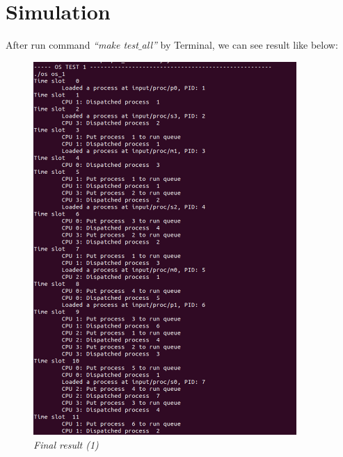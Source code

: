 \documentclass[13pt,a4paper]{article}
\begin{document}
	\section{Simulation}
		After run command \textit{``make test$\_$all''} by Terminal, we can see result like below:
		\begin{figure}[h!]
			\begin{center}
				\includegraphics[width=10cm]{final_1.png}
				\caption{\textit{Final result (1)}}
			\end{center}
		\end{figure}
\end{document}

